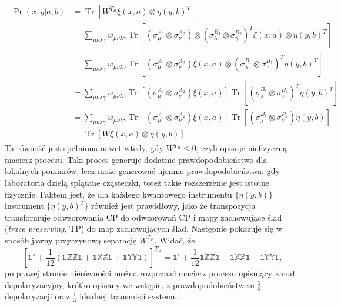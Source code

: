 \documentclass[10pt]{article} %
\DeclareMathOperator{\Trs}{Tr}
\newcommand{\X}{\mathbb{X}}
\newcommand{\Y}{\mathbb{Y}}
\newcommand{\Z}{\mathbb{Z}}
\newcommand{\I}{\mathbb{1}}
\newcommand{\IO}{\mathbb{1}^\circ}
\begin{document}
\begin{align}
\begin{split}
\Pr(x,y|a,b) &= \Trs\left[W^{T_B} \xi(x,a) \otimes \eta(y,b)^{T}\right] \\
	&= \sum_{\mu\nu\lambda\gamma} w_{\mu\nu\lambda\gamma} \Trs \left[ (\sigma_\mu^{A_1}\otimes\sigma_\nu^{A_2})\otimes(\sigma_\lambda^{B_1}\otimes\sigma_\gamma^{B_2})^T \xi(x,a) \otimes \eta(y,b)^{T} \right] \\
	&= \sum_{\mu\nu\lambda\gamma} w_{\mu\nu\lambda\gamma} \Trs \left[ (\sigma_\mu^{A_1}\otimes\sigma_\nu^{A_2}) \xi(x,a) \otimes (\sigma_\lambda^{B_1}\otimes\sigma_\gamma^{B_2})^T\eta(y,b)^{T} \right] \\
	&= \sum_{\mu\nu\lambda\gamma} w_{\mu\nu\lambda\gamma}  \Trs \left[ (\sigma_\mu^{A_1}\otimes\sigma_\nu^{A_2}) \xi(x,a)\right] \Trs \left[ (\sigma_\lambda^{B_1}\otimes\sigma_\gamma^{B_2})^T\eta(y,b)^{T} \right] \\
	&= \sum_{\mu\nu\lambda\gamma} w_{\mu\nu\lambda\gamma}  \Trs \left[ (\sigma_\mu^{A_1}\otimes\sigma_\nu^{A_2}) \xi(x,a)\right] \Trs \left[ (\sigma_\lambda^{B_1}\otimes\sigma_\gamma^{B_2})\eta(y,b) \right] \\
	&=  \Trs\left[W \xi(x,a) \otimes \eta(y,b)\right]
\end{split}
\end{align}
Ta równość jest spełniona nawet wtedy, gdy $W^{T_B} \leq 0$, czyli opisuje niefizyczną macierz procesu. Taki proces generuje dodatnie prawdopodobieństwo dla lokalnych pomiarów, lecz może generować ujemne prawdopodobieństwa, gdy laboratoria dzielą splątane cząsteczki, toteż takie rozszerzenie jest istotne fizycznie.
Faktem jest, że dla każdego kwantowego instrumentu $\{ \eta(y,b) \}$ instrument $\{ \eta(y,b)^T \}$ również jest prawidłowy, jako że transpozycja transformuje odwzorowania CP do odwzorowań CP i mapy zachowujące ślad (\textit{trace preserving}, TP) do map zachowujących ślad. Następnie pokazuje się w sposób jawny przyczynową
separację $W^{T_B}$. Widać, że 
\begin{equation}
\left[\IO + \frac{1}{12}\left(\I\Z\Z\I + \I\X\X\I + \I\Y\Y\I\right)\right]^{T_B} = \IO + \frac{1}{12}\I\Z\Z\I + \I\X\X\I - \I\Y\Y\I, 
\end{equation}
po prawej stronie nierówności można rozpoznać macierz procesu opisujący kanał depolaryzacyjny, krótko opisany we wstępie, z prawdopodobieństwem $\frac{2}{3}$ depolaryzacji oraz $\frac{1}{3}$ idealnej transmisji systemu.
\end{document}

